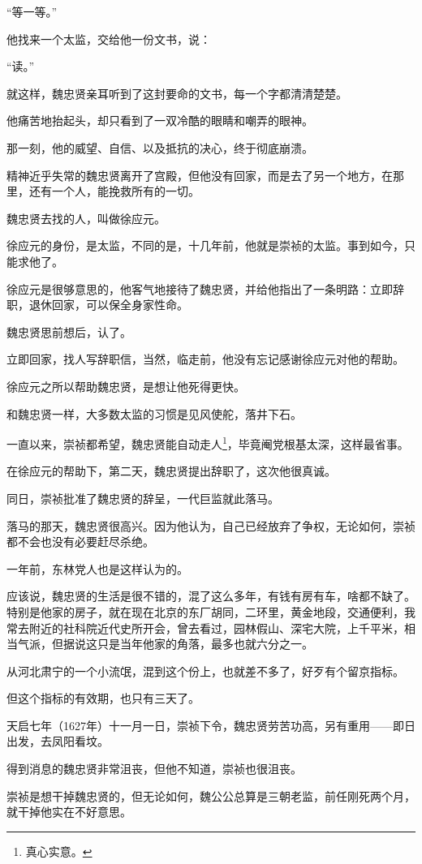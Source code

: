 \begin{multicols}{\theparacolNo}
“等一等。”

他找来一个太监，交给他一份文书，说：

“读。”

就这样，魏忠贤亲耳听到了这封要命的文书，每一个字都清清楚楚。

他痛苦地抬起头，却只看到了一双冷酷的眼睛和嘲弄的眼神。

那一刻，他的威望、自信、以及抵抗的决心，终于彻底崩溃。

精神近乎失常的魏忠贤离开了宫殿，但他没有回家，而是去了另一个地方，在那里，还有一个人，能挽救所有的一切。

魏忠贤去找的人，叫做徐应元。

徐应元的身份，是太监，不同的是，十几年前，他就是崇祯的太监。事到如今，只能求他了。

徐应元是很够意思的，他客气地接待了魏忠贤，并给他指出了一条明路：立即辞职，退休回家，可以保全身家性命。

魏忠贤思前想后，认了。

立即回家，找人写辞职信，当然，临走前，他没有忘记感谢徐应元对他的帮助。

徐应元之所以帮助魏忠贤，是想让他死得更快。

和魏忠贤一样，大多数太监的习惯是见风使舵，落井下石。

一直以来，崇祯都希望，魏忠贤能自动走人\footnote{真心实意。}，毕竟阉党根基太深，这样最省事。

在徐应元的帮助下，第二天，魏忠贤提出辞职了，这次他很真诚。

同日，崇祯批准了魏忠贤的辞呈，一代巨监就此落马。

落马的那天，魏忠贤很高兴。因为他认为，自己已经放弃了争权，无论如何，崇祯都不会也没有必要赶尽杀绝。

一年前，东林党人也是这样认为的。

应该说，魏忠贤的生活是很不错的，混了这么多年，有钱有房有车，啥都不缺了。特别是他家的房子，就在现在北京的东厂胡同，二环里，黄金地段，交通便利，我常去附近的社科院近代史所开会，曾去看过，园林假山、深宅大院，上千平米，相当气派，但据说这只是当年他家的角落，最多也就六分之一。

从河北肃宁的一个小流氓，混到这个份上，也就差不多了，好歹有个留京指标。

但这个指标的有效期，也只有三天了。

天启七年（1627年）十一月一日，崇祯下令，魏忠贤劳苦功高，另有重用——即日出发，去凤阳看坟。

得到消息的魏忠贤非常沮丧，但他不知道，崇祯也很沮丧。

崇祯是想干掉魏忠贤的，但无论如何，魏公公总算是三朝老监，前任刚死两个月，就干掉他实在不好意思。


\end{multicols}
